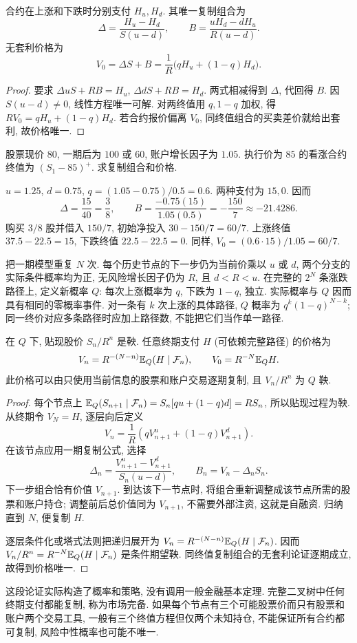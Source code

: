 \begin{theorem}[复制与一期定价]
合约在上涨和下跌时分别支付 $H_u,H_d$. 其唯一复制组合为
\[
 \Delta=\frac{H_u-H_d}{S(u-d)},\qquad
 B=\frac{uH_d-dH_u}{R(u-d)}.
\]
无套利价格为
\[
 V_0=\Delta S+B=\frac1R\bigl(qH_u+(1-q)H_d\bigr).
\]
\end{theorem}
\begin{proof}
要求 $\Delta uS+RB=H_u$, $\Delta dS+RB=H_d$. 两式相减得到 $\Delta$, 代回得 $B$. 因 $S(u-d)\ne0$, 线性方程唯一可解. 对两终值用 $q,1-q$ 加权, 得 $RV_0=qH_u+(1-q)H_d$. 若合约报价偏离 $V_0$, 同终值组合的买卖差价就给出套利, 故价格唯一.
\end{proof}

\begin{example}
股票现价 $80$, 一期后为 $100$ 或 $60$, 账户增长因子为 $1.05$. 执行价为 $85$ 的看涨合约终值为 $(S_1-85)^+$. 求复制组合和价格.
\end{example}
\begin{solution}
$u=1.25$, $d=0.75$, $q=(1.05-0.75)/0.5=0.6$. 两种支付为 $15,0$. 因而
\[
 \Delta=\frac{15}{40}=\frac38,\qquad
 B=\frac{-0.75(15)}{1.05(0.5)}=-\frac{150}7\approx-21.4286.
\]
购买 $3/8$ 股并借入 $150/7$, 初始净投入 $30-150/7=60/7$. 上涨终值 $37.5-22.5=15$, 下跌终值 $22.5-22.5=0$. 同样,
$V_0=(0.6\cdot15)/1.05=60/7$.
\end{solution}

把一期模型重复 $N$ 次. 每个历史节点的下一步仍为当前价乘以 $u$ 或 $d$, 两个分支的实际条件概率均为正, 无风险增长因子仍为 $R$, 且 $d<R<u$. 在完整的 $2^N$ 条涨跌路径上, 定义新概率 $Q$: 每次上涨概率为 $q$, 下跌为 $1-q$, 独立. 实际概率与 $Q$ 因而具有相同的零概率事件. 对一条有 $k$ 次上涨的具体路径, $Q$ 概率为 $q^k(1-q)^{N-k}$; 同一终价对应多条路径时应加上路径数, 不能把它们当作单一路径.

\begin{proposition}
在 $Q$ 下, 贴现股价 $S_n/R^n$ 是鞅. 任意终期支付 $H$ (可依赖完整路径) 的价格为
\[
 V_n=R^{-(N-n)}\mathbb E_Q(H\mid\mathcal F_n),\qquad
 V_0=R^{-N}\mathbb E_QH.
\]
此价格可以由只使用当前信息的股票和账户交易逐期复制, 且 $V_n/R^n$ 为 $Q$ 鞅.
\end{proposition}
\begin{proof}
每个节点上
$\mathbb E_Q(S_{n+1}\mid\mathcal F_n)=S_n[qu+(1-q)d]=RS_n$, 所以贴现过程为鞅. 从终期令 $V_N=H$, 逐层向后定义
\[
 V_n=\frac1R(qV_{n+1}^{u}+(1-q)V_{n+1}^{d}).
\]
在该节点应用一期复制公式, 选择
\[
 \Delta_n=\frac{V_{n+1}^{u}-V_{n+1}^{d}}{S_n(u-d)},\qquad
 B_n=V_n-\Delta_n S_n.
\]
下一步组合恰有价值 $V_{n+1}$. 到达该下一节点时, 将组合重新调整成该节点所需的股票和账户持仓; 调整前后总价值同为 $V_{n+1}$, 不需要外部注资, 这就是自融资. 归纳直到 $N$, 便复制 $H$.

逐层条件化或塔式法则把递归展开为
$V_n=R^{-(N-n)}\mathbb E_Q(H\mid\mathcal F_n)$. 因而
$V_n/R^n=R^{-N}\mathbb E_Q(H\mid\mathcal F_n)$ 是条件期望鞅. 同终值复制组合的无套利论证逐期成立, 故得到价格唯一.
\end{proof}
这段论证实际构造了概率和策略, 没有调用一般金融基本定理. 完整二叉树中任何终期支付都能复制, 称为市场完备. 如果每个节点有三个可能股票价而只有股票和账户两个交易工具, 一般有三个终值方程但仅两个未知持仓, 不能保证所有合约都可复制, 风险中性概率也可能不唯一.

